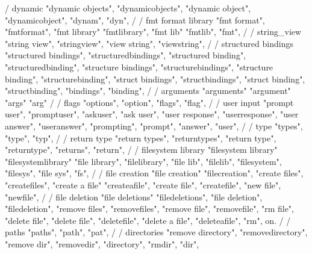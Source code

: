 {{{{{{{        / dynamic 
        "dynamic objects",
        "dynamicobjects",
        "dynamic object",
        "dynamicobject",
        "dynam",
        "dyn",
        /
        / fmt format library
        "fmt format",
        "fmtformat",
        "fmt library"
        "fmtlibrary",
        "fmt lib"
        "fmtlib",
        "fmt",
        /  
        / string_view
        "string view",
        "stringview",
        "view string",
        "viewstring",
        /
        / structured bindings
        "structured bindings",
        "structuredbindings",
        "structured binding",
        "structuredbinding", 
        "structure bindings",
        "structurebindings", 
        "structure binding", 
        "structurebinding",
        "struct bindings",
        "structbindings",
        "struct binding",
        "structbinding",
        "bindings",
        "binding",
        /
        / arguments 
        "arguments"
        "argument"
        "args"
        "arg"
        /
        / flags 
        "options",
        "option",
        "flags",
        "flag",
        /
        / user input 
        "prompt user",  
        "promptuser",  
        "askuser",  
        "ask user",  
        "user response",  
        "userresponse",  
        "user answer",  
        "useranswer",  
        "prompting",  
        "prompt",  
        "answer",  
        "user",  
        /
        / type 
        "types",  
        "type",  
        "typ",  
        /
        / return type 
        "return types", 
        "returntypes", 
        "return type", 
        "returntype", 
        "returns", 
        "return", 
        /
        / filesystem library
        "filesystem library"
        "filesystemlibrary"
        "file library",
        "filelibrary",
        "file lib", 
        "filelib",
        "filesystem",
        "filesys",
        "file sys",
        "fs",
        / 
        / file creation 
        "file creation"
        "filecreation",
        "create files",
        "createfiles", 
        "create a file"
        "createafile",
        "create file", 
        "createfile",
        "new file", 
        "newfile", 
        /
        / file deletion 
        "file deletions"
        "filedeletions",
        "file deletion",
        "filedeletion", 
        "remove files", 
        "removefiles",
        "remove file",
        "removefile",
        "rm file",
        "delete file",
        "delete file",
        "deletefile",
        "delete a file",
        "deleteafile",
        "rm", on. 
        /
        / paths 
        "paths", 
        "path", 
        "pat",
        /
        / directories
        "remove directory",
        "removedirectory",
        "remove dir",
        "removedir",
        "directory",
        "rmdir",
        "dir",

}}}}}}}
